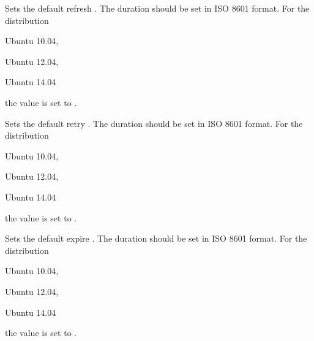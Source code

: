 
Sets the default refresh . The duration should be set in 
ISO 8601 format.
For the distribution
\begin{inparaitem}
\item[\TheDistribution{ubuntu}] Ubuntu 10.04,
\item[\TheDistribution{ubuntu}] Ubuntu 12.04,
\item[\TheDistribution{ubuntu}] Ubuntu 14.04
\end{inparaitem}
the value is set to .


Sets the default retry . The duration should be set in 
ISO 8601 format.
For the distribution
\begin{inparaitem}
\item[\TheDistribution{ubuntu}] Ubuntu 10.04,
\item[\TheDistribution{ubuntu}] Ubuntu 12.04,
\item[\TheDistribution{ubuntu}] Ubuntu 14.04
\end{inparaitem}
the value is set to .


Sets the default expire . The duration should be set in 
ISO 8601 format.
For the distribution
\begin{inparaitem}
\item[\TheDistribution{ubuntu}] Ubuntu 10.04,
\item[\TheDistribution{ubuntu}] Ubuntu 12.04,
\item[\TheDistribution{ubuntu}] Ubuntu 14.04
\end{inparaitem}
the value is set to .

